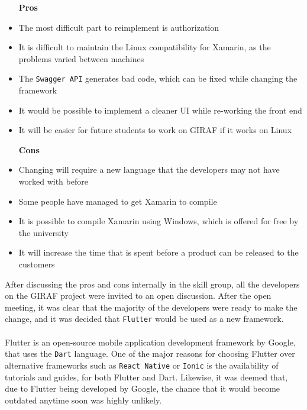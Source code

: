 \begin{itemize}
    \item [\textbf{Pros}]
    \item The most difficult part to reimplement is authorization
    \item It is difficult to maintain the Linux compatibility for Xamarin, as the problems varied between machines
    \item The \texttt{Swagger API} generates bad code, which can be fixed while changing the framework
    \item It would be possible to implement a cleaner UI while re-working the front end
    \item It will be easier for future students to work on GIRAF if it works on Linux
    \item [\textbf{Cons}]
    \item Changing will require a new language that the developers may not have worked with before
    \item Some people have managed to get Xamarin to compile
    \item It is possible to compile Xamarin using Windows, which is offered for free by the university
    \item It will increase the time that is spent before a product can be released to the customers
\end{itemize}
\noindent
After discussing the pros and cons internally in the skill group, all the developers on the GIRAF project were invited to an open discussion. 
After the open meeting, it was clear that the majority of the developers were ready to make the change, and it was decided that \texttt{Flutter} would be used as a new framework. 
\\\\
Flutter is an open-source mobile application development framework by Google, that uses the \texttt{Dart} language.
One of the major reasons for choosing Flutter over alternative frameworks such as \texttt{React Native} or \texttt{Ionic} is the availability of tutorials and guides, for both Flutter and Dart. 
Likewise, it was deemed that, due to Flutter being developed by Google, the chance that it would become outdated anytime soon was highly unlikely.

